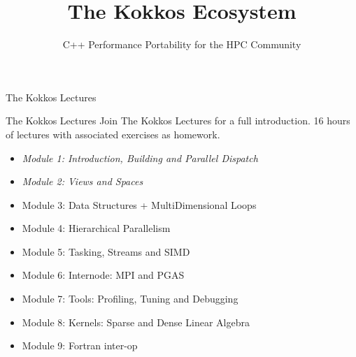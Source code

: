 
\usepackage{tikz}


\title{The Kokkos Ecosystem}

\author{C++ Performance Portability for the HPC Community}




\shorttrue
\mediumfalse
\fullfalse



% 

\begin{frame}
	\titlepage
\end{frame}



\begin{frame}{The Kokkos Lectures}
        
	\begin{block}{The Kokkos Lectures}
		Join The Kokkos Lectures for a full introduction. 16 hours of lectures with associated exercises as homework.
	\end{block}

\begin{itemize}
	\item \textit{Module 1: Introduction, Building and Parallel Dispatch}
	\item \textit{Module 2: Views and Spaces}
	\item Module 3: Data Structures + MultiDimensional Loops
	\item Module 4: Hierarchical Parallelism
	\item Module 5: Tasking, Streams and SIMD
	\item Module 6: Internode: MPI and PGAS
	\item Module 7: Tools: Profiling, Tuning and Debugging
	\item Module 8: Kernels: Sparse and Dense Linear Algebra
    \item Module 9: Fortran inter-op
\end{itemize}
\end{frame}

